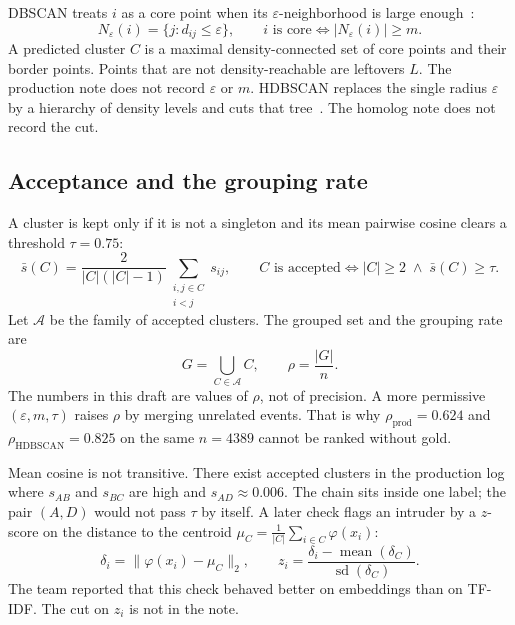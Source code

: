\documentclass[acmlarge,screen]{acmart}
\begin{document}
DBSCAN treats \(i\) as a core point when its \(\varepsilon\)-neighborhood is large enough~\cite{ester1996dbscan,schubert2017dbscan}:
\begin{equation}
  N_\varepsilon(i)=\{j:d_{ij}\le\varepsilon\},\qquad
  i\text{ is core}\iff \lvert N_\varepsilon(i)\rvert\ge m.
\end{equation}
A predicted cluster \(C\) is a maximal density-connected set of core points and their border points. Points that are not density-reachable are leftovers \(L\). The production note does not record \(\varepsilon\) or \(m\). HDBSCAN replaces the single radius \(\varepsilon\) by a hierarchy of density levels and cuts that tree~\cite{campello2013hdbscan,mcinnes2017hdbscan}. The homolog note does not record the cut.

\subsection{Acceptance and the grouping rate}

A cluster is kept only if it is not a singleton and its mean pairwise cosine clears a threshold \(\tau=0.75\):
\begin{equation}
  \bar s(C)=\frac{2}{\lvert C\rvert(\lvert C\rvert-1)}\sum_{\substack{i,j\in C\\ i<j}} s_{ij},\qquad
  C\text{ is accepted}\iff \lvert C\rvert\ge 2 \;\wedge\; \bar s(C)\ge\tau.
  \label{eq:accept}
\end{equation}
Let \(\mathcal{A}\) be the family of accepted clusters. The grouped set and the grouping rate are
\begin{equation}
  G=\bigcup_{C\in\mathcal{A}} C,\qquad
  \rho=\frac{\lvert G\rvert}{n}.
  \label{eq:rho}
\end{equation}
The numbers in this draft are values of \(\rho\), not of precision. A more permissive \((\varepsilon,m,\tau)\) raises \(\rho\) by merging unrelated events. That is why \(\rho_{\text{prod}}=0.624\) and \(\rho_{\text{HDBSCAN}}=0.825\) on the same \(n=4389\) cannot be ranked without gold.

Mean cosine is not transitive. There exist accepted clusters in the production log where \(s_{AB}\) and \(s_{BC}\) are high and \(s_{AD}\approx 0.006\). The chain sits inside one label; the pair \((A,D)\) would not pass \(\tau\) by itself. A later check flags an intruder by a \(z\)-score on the distance to the centroid \(\mu_C=\frac{1}{\lvert C\rvert}\sum_{i\in C}\varphi(x_i)\):
\begin{equation}
  \delta_i=\lVert\varphi(x_i)-\mu_C\rVert_2,\qquad
  z_i=\frac{\delta_i-\operatorname{mean}(\delta_C)}{\operatorname{sd}(\delta_C)}.
\end{equation}
The team reported that this check behaved better on embeddings than on TF-IDF. The cut on \(z_i\) is not in the note.
\end{document}
